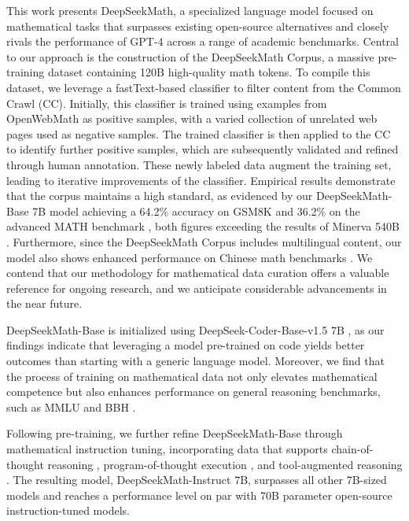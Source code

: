 This work presents DeepSeekMath, a specialized language model focused on mathematical tasks that surpasses existing open-source alternatives and closely rivals the performance of GPT-4 across a range of academic benchmarks. Central to our approach is the construction of the DeepSeekMath Corpus, a massive pre-training dataset containing 120B high-quality math tokens. To compile this dataset, we leverage a fastText-based classifier \citep{joulin2016fasttext} to filter content from the Common Crawl (CC). Initially, this classifier is trained using examples from OpenWebMath \citep{openwebmath} as positive samples, with a varied collection of unrelated web pages used as negative samples. The trained classifier is then applied to the CC to identify further positive samples, which are subsequently validated and refined through human annotation. These newly labeled data augment the training set, leading to iterative improvements of the classifier. Empirical results demonstrate that the corpus maintains a high standard, as evidenced by our DeepSeekMath-Base 7B model achieving a 64.2\% accuracy on GSM8K \citep{gsm8k} and 36.2\% on the advanced MATH benchmark \citep{MATH}, both figures exceeding the results of Minerva 540B \citep{minerva}. Furthermore, since the DeepSeekMath Corpus includes multilingual content, our model also shows enhanced performance on Chinese math benchmarks \citep{wei2023cmath,agieval}. We contend that our methodology for mathematical data curation offers a valuable reference for ongoing research, and we anticipate considerable advancements in the near future.

DeepSeekMath-Base is initialized using DeepSeek-Coder-Base-v1.5 7B \citep{deepseek-coder}, as our findings indicate that leveraging a model pre-trained on code yields better outcomes than starting with a generic language model. Moreover, we find that the process of training on mathematical data not only elevates mathematical competence but also enhances performance on general reasoning benchmarks, such as MMLU \citep{mmlu} and BBH \citep{bbh}.

Following pre-training, we further refine DeepSeekMath-Base through mathematical instruction tuning, incorporating data that supports chain-of-thought reasoning \citep{cot}, program-of-thought execution \citep{pot,pal}, and tool-augmented reasoning \citep{tora}. The resulting model, DeepSeekMath-Instruct 7B, surpasses all other 7B-sized models and reaches a performance level on par with 70B parameter open-source instruction-tuned models.

